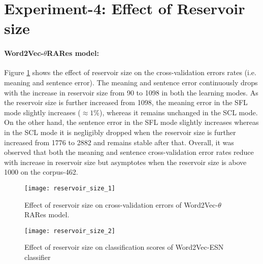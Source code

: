 \section{Experiment-4: Effect of Reservoir size}

\paragraph{Word2Vec-$\theta$RARes model: } Figure \ref{fig:reservoir_size_1} shows the effect of reservoir size on the cross-validation errors rates (i.e. meaning and sentence error). The meaning and sentence error continuously drops with the increase in reservoir size from 90 to 1098 in both the learning modes.  As the reservoir size is further increased from 1098, the meaning error in the SFL mode slightly increases ($\approx 1\%$), whereas it remains unchanged in the SCL mode. On the other hand, the sentence error in the SFL mode slightly increases whereas in the SCL mode it is negligibly dropped when the reservoir size is further increased from 1776 to 2882 and remains stable after that. Overall, it was observed that both the meaning and sentence cross-validation error rates reduce with increase in reservoir size but asymptotes when the reservoir size is above 1000 on the corpus-462.

\begin{figure}[hbtp]
\centering
\texttt{[image: reservoir\_size\_1]}
\caption[Effect of reservoir size on Word2Vec-$\theta$RARes model]{Effect of reservoir size on cross-validation errors of Word2Vec-$\theta$RARes model.}
\label{fig:reservoir_size_1}
\end{figure}

\begin{figure}[hbtp]
\centering
\texttt{[image: reservoir\_size\_2]}
\caption[Effect of reservoir size on Word2Vec-ESN classifier]{Effect of reservoir size on classification scores of Word2Vec-ESN classifier}
\label{fig:reservoir_size_2}
\end{figure}

